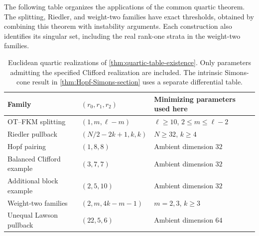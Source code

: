 The following table organizes the applications of the common
quartic theorem. The splitting, Riedler, and weight-two families
have exact thresholds, obtained by combining this theorem with
instability arguments. Each construction also identifies its
singular set, including the real rank-one strata in the weight-two
families.

\begin{table}[htbp]
\centering\small
\setlength{\tabcolsep}{5pt}
\renewcommand{\arraystretch}{1.15}
\caption{Euclidean quartic realizations of
\cref{thm:quartic-table-existence}. Only parameters admitting the
specified Clifford realization are included. The intrinsic
Simons-cone result in \cref{thm:Hopf-Simons-section} uses a
separate differential table.}
\label{tab:quartic-weight-realizations}
\begin{tabular}{@{}lll@{}}
\toprule
Family & $(r_0,r_1,r_2)$ & Minimizing parameters used here\\
\midrule
OT--FKM splitting & $(1,m,\ell-m)$ & $\ell\ge10$, $2\le m\le\ell-2$\\
Riedler pullback & $(N/2-2k+1,k,k)$ & $N\ge32$, $k\ge4$\\
Hopf pairing & $(1,8,8)$ & Ambient dimension $32$\\
Balanced Clifford example & $(3,7,7)$ & Ambient dimension $32$\\
Additional block example & $(2,5,10)$ & Ambient dimension $32$\\
Weight-two families & $(2,m,4k-m-1)$ & $m=2,3$, $k\ge3$\\
Unequal Lawson pullback & $(22,5,6)$ & Ambient dimension $64$\\
\bottomrule
\end{tabular}
\end{table}
